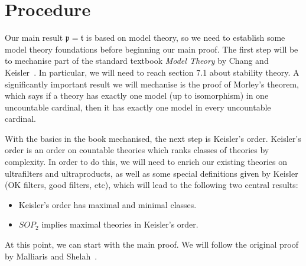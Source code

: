\documentclass[11pt]{article}
\theoremstyle{definition}
\begin{document}
\section{Procedure}
Our main result $\mathfrak p=\mathfrak t$ is based on model theory, so we need to establish some model theory foundations before beginning our main proof. The first step will be to mechanise part of the standard textbook \emph{Model Theory} by Chang and Keisler~\cite{ChangKeisler1990}. In particular, we will need to reach section 7.1 about stability theory. A significantly important result we will mechanise is the proof of Morley's theorem, which says if a theory has exactly one model (up to isomorphism) in one uncountable cardinal, then it has exactly one model in every uncountable cardinal.

With the basics in the book mechanised, the next step is Keisler's order. Keisler's order is an order on countable theories which ranks classes of theories by complexity. In order to do this, we will need to enrich our existing theories on ultrafilters and ultraproducts, as well as some special definitions given by Keisler (OK filters, good filters, etc), which will lead to the following two central results:
\begin{itemize}
    \item Keisler's order has maximal and minimal classes.
    \item $\mathit{SOP_2}$ implies maximal theories in Keisler's order.
\end{itemize}

At this point, we can start with the main proof. We will follow the original proof by Malliaris and Shelah~\cite{MalliarisShelah2016}.





\end{document}
